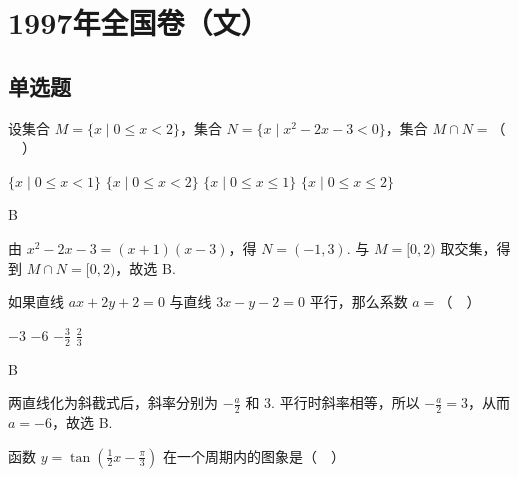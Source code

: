 \chapter{1997年全国卷（文）}
\section{单选题}

\begin{problem}
设集合 \(M = \{x \mid 0 \leqslant x < 2\}\)，集合 \(N = \{x \mid x^2 - 2x - 3 < 0\}\)，集合 \(M \cap N =\)（\(\quad\)）

\choices
    {\(\{x\mid 0\leqslant x < 1\}\)}
    {\(\{x\mid 0\leqslant x < 2\}\)}
    {\(\{x\mid 0\leqslant x\leqslant 1\}\)}
    {\(\{x\mid 0\leqslant x\leqslant 2\}\)}

\end{problem}

\begin{answer}
B
\end{answer}

\begin{solution}
由 \(x^{2}-2x-3=(x+1)(x-3)\)，得 \(N=(-1,3)\). 与 \(M=[0,2)\) 取交集，得到 \(M\cap N=[0,2)\)，故选 B.
\end{solution}

\begin{problem}
如果直线 \(ax + 2y + 2 = 0\) 与直线 \(3x - y - 2 = 0\) 平行，那么系数 \(a =\)（\(\quad\)）

\choices
    {\(-3\)}
    {\(-6\)}
    {\(-\frac{3}{2}\)}
    {\(\frac{2}{3} \)}

\end{problem}

\begin{answer}
B
\end{answer}

\begin{solution}
两直线化为斜截式后，斜率分别为 \(-\frac a2\) 和 \(3\).
平行时斜率相等，所以 \(-\frac{a}{2}=3\)，从而 \(a=-6\)，故选 B.
\end{solution}

\begin{problem}
函数 \(y = \tan \left(\frac{1}{2}x - \frac{\pi}{3}\right)\) 在一个周期内的图象是（\(\quad\)）

    {}
    {}
    {}

\end{problem}

